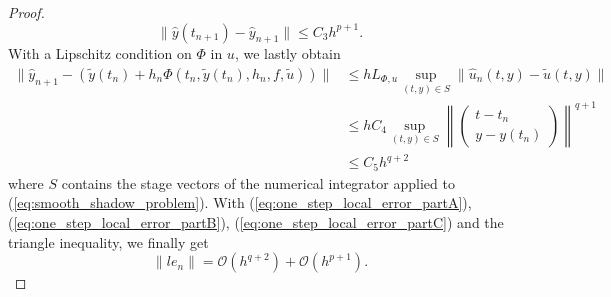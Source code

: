 \documentclass{book}
\theoremstyle{definition}
\begin{document}
\begin{proof}
    \begin{equation}\label{eq:one_step_local_error_partB}
        \lVert  \hat{y}(t_{n+1}) - \hat{y}_{n+1} \rVert \leq C_{3}h^{p+1}. 
    \end{equation}
    With a Lipschitz condition on $\Phi$ in $u$, we lastly obtain
    \begin{align}\label{eq:one_step_local_error_partC}
        \lVert \hat{y}_{n+1} - (\tilde{y}(t_{n}) + h_{n}\Phi(t_{n}, \tilde{y}(t_{n}), h_{n}, f, \tilde{u})) \rVert 
        &\leq hL_{\Phi, u} \sup_{(t, y)\in S}\lVert \hat{u}_{n}(t, y) -\tilde{u}(t, y)\rVert \nonumber\\
        &\leq hC_{4}\sup_{(t,y)\in S}\left\lVert \begin{pmatrix}
            t-t_{n} \\
            y - y(t_{n})
        \end{pmatrix} \right\rVert^{q+1}\nonumber\\
        &\leq C_{5}h^{q+2}
    \end{align}
    where $S$ contains the stage vectors of the numerical integrator applied to (\ref{eq:smooth_shadow_problem}). With (\ref{eq:one_step_local_error_partA}), (\ref{eq:one_step_local_error_partB}), (\ref{eq:one_step_local_error_partC}) and the triangle inequality, we finally get
    \begin{equation}
        \lVert le_{n} \rVert = \mathcal{O}(h^{q+2}) + \mathcal{O}(h^{p+1}).  
    \end{equation}
\end{proof}
\end{document}
